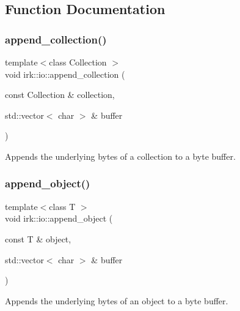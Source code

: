 \subsection{Function Documentation}
\mbox{\label{namespaceirk_1_1io_ae89e77960d5da14cd0068835eaa3a442}} 
\subsubsection{\texorpdfstring{append\+\_\+collection()}{append\_collection()}}
{\footnotesize\ttfamily template$<$class Collection $>$ \\
void irk\+::io\+::append\+\_\+collection (\begin{DoxyParamCaption}\item[{const Collection \&}]{collection,  }\item[{std\+::vector$<$ char $>$ \&}]{buffer }\end{DoxyParamCaption})}



Appends the underlying bytes of a collection to a byte buffer. 

\mbox{\label{namespaceirk_1_1io_a6b56c2c88f08eba5647f662fe701be3c}} 
\subsubsection{\texorpdfstring{append\+\_\+object()}{append\_object()}}
{\footnotesize\ttfamily template$<$class T $>$ \\
void irk\+::io\+::append\+\_\+object (\begin{DoxyParamCaption}\item[{const T \&}]{object,  }\item[{std\+::vector$<$ char $>$ \&}]{buffer }\end{DoxyParamCaption})}



Appends the underlying bytes of an object to a byte buffer. 

\mbox{\label{namespaceirk_1_1io_a7eb5e1bc8d97d131311b0054a1b79b94}} 
